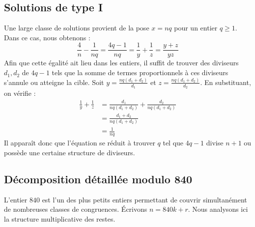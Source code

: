 \documentclass[12pt, a4paper]{article}
\begin{document}
\subsection{Solutions de type I}
Une large classe de solutions provient de la pose $x = nq$ pour un entier $q \ge 1$. Dans ce cas, nous obtenons :
\[ \frac{4}{n} - \frac{1}{nq} = \frac{4q-1}{nq} = \frac{1}{y} + \frac{1}{z} = \frac{y+z}{yz} \]
Afin que cette égalité ait lieu dans les entiers, il suffit de trouver des diviseurs $d_1, d_2$ de $4q-1$ tels que la somme de termes proportionnels à ces diviseurs s'annule ou atteigne la cible.
Soit $y = \frac{nq(d_1+d_2)}{d_1}$ et $z = \frac{nq(d_1+d_2)}{d_2}$. En substituant, on vérifie :
\begin{align*}
\frac{1}{y} + \frac{1}{z} &= \frac{d_1}{nq(d_1+d_2)} + \frac{d_2}{nq(d_1+d_2)} \\
&= \frac{d_1+d_2}{nq(d_1+d_2)} \\
&= \frac{1}{nq}
\end{align*}
Il apparaît donc que l'équation se réduit à trouver $q$ tel que $4q-1$ divise $n+1$ ou possède une certaine structure de diviseurs.

\subsection{Décomposition détaillée modulo 840}
L'entier $840$ est l'un des plus petits entiers permettant de couvrir simultanément de nombreuses classes de congruences.
Écrivons $n = 840k + r$. Nous analysons ici la structure multiplicative des restes.
\end{document}
